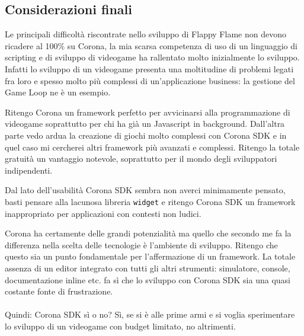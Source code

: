 		
		\subsection{Considerazioni finali}
			Le principali difficoltà riscontrate nello sviluppo di Flappy Flame non devono ricadere al 100\% su Corona, la mia scarsa competenza di uso di un linguaggio di scripting e di sviluppo di videogame ha rallentato molto inizialmente lo sviluppo. Infatti lo sviluppo di un videogame presenta una moltitudine di problemi legati fra loro e spesso molto più complessi di un’applicazione business: la gestione del Game Loop ne è un esempio.
			
			Ritengo Corona un framework perfetto per avvicinarsi alla programmazione di videogame soprattutto per chi ha già un Javascript in background. Dall'altra parte vedo ardua la creazione di giochi molto complessi con Corona SDK e in quel caso mi cercherei altri framework più avanzati e complessi. Ritengo la totale gratuità un vantaggio notevole, soprattutto per il mondo degli sviluppatori indipendenti. 
			
			Dal lato dell'usabilità Corona SDK sembra non averci minimamente pensato, basti pensare alla lacunosa libreria \verb|widget| e ritengo Corona SDK un framework inappropriato per applicazioni con contesti non ludici.
			
			Corona ha certamente delle grandi potenzialità ma quello che secondo me fa la differenza nella scelta delle tecnologie è l’ambiente di sviluppo. Ritengo che questo sia un punto fondamentale per l’affermazione di un framework. La totale assenza di un editor integrato con tutti gli altri strumenti: simulatore, console, documentazione inline etc. fa sì che lo sviluppo con Corona SDK sia una quasi costante fonte di frustrazione.
			
			\paragraph{} Quindi: Corona SDK sì o no? Sì, se si è alle prime armi e si voglia sperimentare lo sviluppo di un videogame con budget limitato, no altrimenti.
			
		

